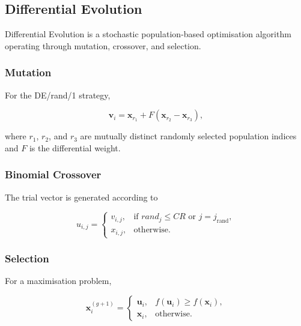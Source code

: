 \documentclass[review]{elsarticle}
\begin{document}
%


\subsection{Differential Evolution}
\label{sec:de_background}

Differential Evolution is a stochastic population-based optimisation
algorithm operating through mutation, crossover, and selection.


\subsubsection{Mutation}

For the DE/rand/1 strategy,

\begin{equation}
\mathbf{v}_{i}
=
\mathbf{x}_{r_1}
+
F
\left(
\mathbf{x}_{r_2}
-
\mathbf{x}_{r_3}
\right),
\end{equation}

where $r_1$, $r_2$, and $r_3$ are mutually distinct randomly selected
population indices and $F$ is the differential weight.


\subsubsection{Binomial Crossover}

The trial vector is generated according to

\begin{equation}
u_{i,j}
=
\begin{cases}
v_{i,j},
& \text{if } rand_j \leq CR
\text{ or } j=j_{\mathrm{rand}}, \\

x_{i,j},
& \text{otherwise}.
\end{cases}
\end{equation}


\subsubsection{Selection}

For a maximisation problem,

\begin{equation}
\mathbf{x}_{i}^{(g+1)}
=
\begin{cases}
\mathbf{u}_{i},
& f(\mathbf{u}_{i}) \geq f(\mathbf{x}_{i}),\\

\mathbf{x}_{i},
& \text{otherwise}.
\end{cases}
\end{equation}
\end{document}
